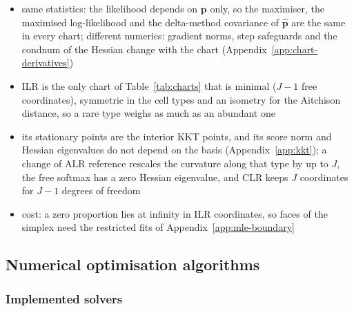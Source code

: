 \begin{itemize}
  \item same statistics: the likelihood depends on \(\boldsymbol{p}\) only, so the maximiser, the maximised log-likelihood
        and the delta-method covariance of \(\hat{\boldsymbol{p}}\) are the same in every chart; different numerics: gradient
        norms, step safeguards and the \gls{condnum} of the Hessian change with the chart
        (Appendix~\ref{app:chart-derivatives})
  \item ILR is the only chart of Table~\ref{tab:charts} that is minimal (\(J-1\) free coordinates), symmetric in the
        cell types and an \gls{isometry} for the Aitchison distance, so a rare type weighs as much as an abundant
        one \cite{egozcueIsometricLogratioTransformations2003,CoordinateRepresentation2015}
  \item its stationary points are the interior KKT points, and its score norm and Hessian eigenvalues do not
        depend on the basis (Appendix~\ref{app:kkt}); a change of ALR reference rescales the curvature along that
        type by up to \(J\), the free softmax has a zero Hessian eigenvalue, and CLR keeps \(J\) coordinates for
        \(J-1\) degrees of freedom
  \item cost: a zero proportion lies at infinity in ILR coordinates, so faces of the simplex need the restricted
        fits of Appendix~\ref{app:mle-boundary}
\end{itemize}

\subsection{Numerical optimisation algorithms}
\label{app:optim}

\subsubsection{Implemented solvers}
\label{app:optim-solvers}

